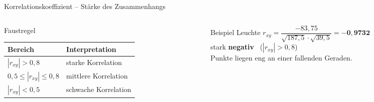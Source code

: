 \documentclass[aspectratio=169,11pt]{beamer}
\newcommand{\mindestzeilenabstand}{%
  \setlength{\lineskiplimit}{2pt}\setlength{\lineskip}{2pt}%
  \setlength{\normallineskiplimit}{2pt}\setlength{\normallineskip}{2pt}}
\begin{document}
\begin{frame}{Korrelationskoeffizient -- Stärke des Zusammenhangs}
  \begin{columns}[T]
    \begin{column}{0.47\textwidth}
      \begin{block}{Faustregel}
        \begin{center}
          \renewcommand{\arraystretch}{1.1}
          \begin{tabular}{ll}
            \toprule
            \textbf{Bereich} & \textbf{Interpretation} \\
            \midrule
            $|r_{xy}| > 0{,}8$             & starke Korrelation \\
            $0{,}5 \le |r_{xy}| \le 0{,}8$ & mittlere Korrelation \\
            $|r_{xy}| < 0{,}5$             & schwache Korrelation \\
            \bottomrule
          \end{tabular}
        \end{center}
      \end{block}
    \end{column}
    \begin{column}{0.51\textwidth}
      \small\mindestzeilenabstand
      \begin{exampleblock}{Beispiel Leuchte}
        $r_{xy} = \dfrac{-83{,}75}{\sqrt{187{,}5} \cdot \sqrt{39{,}5}} = \mathbf{-0{,}9732}$\\[4pt]
        stark \textbf{negativ} \ ($|r_{xy}| > 0{,}8$)\\[2pt]
        Punkte liegen eng an einer fallenden Geraden.
      \end{exampleblock}
    \end{column}
  \end{columns}
\end{frame}
\end{document}
